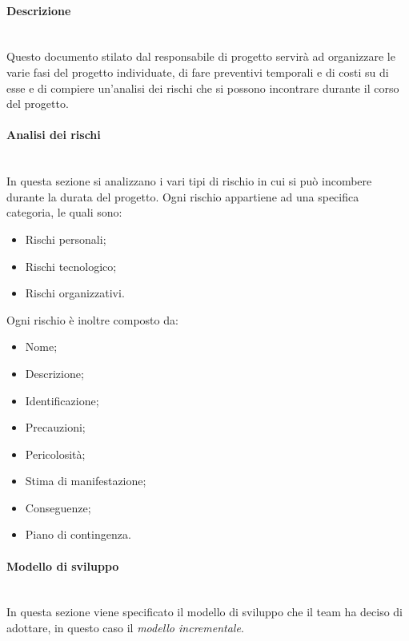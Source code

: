\paragraph {Descrizione}\mbox{}\\
Questo documento stilato dal responsabile di progetto servirà ad organizzare le varie fasi del progetto individuate, di fare preventivi temporali e di costi su di esse e di compiere un'analisi dei rischi che si possono incontrare durante il corso del progetto.
\paragraph {Analisi dei rischi}\mbox{}\\
In questa sezione si analizzano i vari tipi di rischio in cui si può incombere durante la durata del progetto.
Ogni rischio appartiene ad una specifica categoria, le quali sono:
\begin{itemize}
	\item Rischi personali;
	\item Rischi tecnologico;
	\item Rischi organizzativi.
\end{itemize}
Ogni rischio è inoltre composto da:
\begin{itemize}
	\item Nome;
	\item Descrizione;
	\item Identificazione;
	\item Precauzioni;
	\item Pericolosità;
	\item Stima di manifestazione;
	\item Conseguenze;
	\item Piano di contingenza.
\end{itemize}
\paragraph {Modello di sviluppo}\mbox{}\\
In questa sezione viene specificato il modello di sviluppo che il team ha deciso di adottare, in questo caso il \textit{modello incrementale}.
